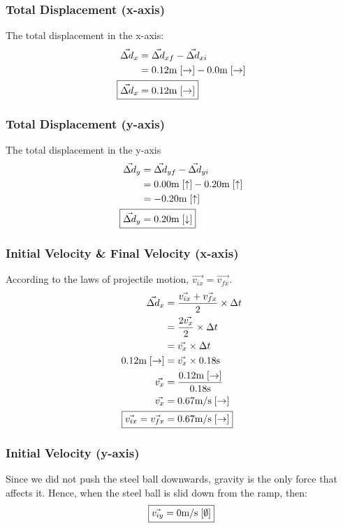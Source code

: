 \documentclass[a4paper,12pt]{article}
\begin{document}
	\subsubsection{Total Displacement (x-axis)}
	The total displacement in the x-axis:
	\begin{align*}
		\vec{\Delta d}_x&=\vec{\Delta d}_{xf}-\vec{\Delta d}_{xi}\\
		&=0.12 \text{m}\;[\rightarrow]-0.0 \text{m}\; [\rightarrow]\\
		\Aboxed{\vec{\Delta d}_x&=0.12\text{m}\; [\rightarrow]}
	\end{align*}
	\subsubsection{Total Displacement (y-axis)}
	The total displacement in the y-axis
	\begin{align*}
		\vec{\Delta d}_y&=\vec{\Delta d}_{yf}-\vec{\Delta d}_{yi}\\
		&=0.00 \text{m}\; [\uparrow]-0.20 \text{m}\; [\uparrow]\\
		&=-0.20\text{m}\; [\uparrow]\\
		\Aboxed{\vec{\Delta d}_y&=0.20\text{m}\; [\downarrow]}
	\end{align*}
	\subsubsection{Initial Velocity \& Final Velocity (x-axis)}
	According to the laws of projectile motion, $\vec{v_{ix}}=\vec{v_{fx}}$.
	\begin{align*}
		\vec{\Delta d}_x&=\frac{\vec{v_{ix}}+\vec{v_{fx}}}{2}\times \Delta t\\
		&=\frac{2\vec{v_x}}{2}\times \Delta t\\
		&=\vec{v_x}\times \Delta t\\
		0.12\text{m}\; [\rightarrow]&=\vec{v_x} \times 0.18\text{s}\\
		\vec{v_x}&=\frac{0.12\text{m}\; [\rightarrow]}{0.18\text{s}}\\
		\vec{v_x}&=0.67\text{m}/\text{s}\;[\rightarrow]\\
		\Aboxed{\vec{v_{ix}}=\vec{v_{fx}}&=0.67\text{m}/\text{s}\;[\rightarrow]}
	\end{align*}
	\subsubsection{Initial Velocity (y-axis)}
	Since we did not push the steel ball downwards, gravity is the only force that affects it. Hence, when the steel ball is slid down from the ramp, then:
	\begin{align*}
		\Aboxed{\vec{v_{iy}}&=0\text{m}/\text{s}\;[\emptyset]}\\
	\end{align*}
\end{document}
